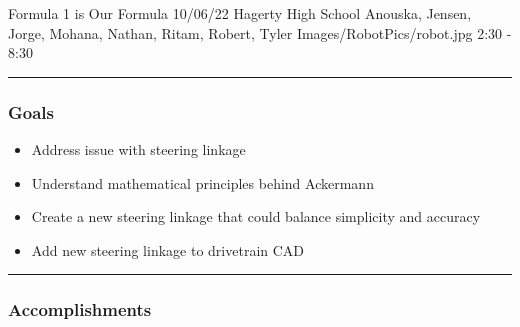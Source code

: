 \insertmeeting 
	{Formula 1 is Our Formula} 
	{10/06/22} 
	{Hagerty High School}
	{Anouska, Jensen, Jorge, Mohana, Nathan, Ritam, Robert, Tyler}
	{Images/RobotPics/robot.jpg}
	{2:30 - 8:30}
	
\noindent\hfil\rule{\textwidth}{.4pt}\hfil
\subsubsection*{Goals}
\begin{itemize}
    \item Address issue with steering linkage
    \item Understand mathematical principles behind Ackermann
    \item Create a new steering linkage that could balance simplicity and accuracy
    \item Add new steering linkage to drivetrain CAD

\end{itemize} 

\noindent\hfil\rule{\textwidth}{.4pt}\hfil

\subsubsection*{Accomplishments}

